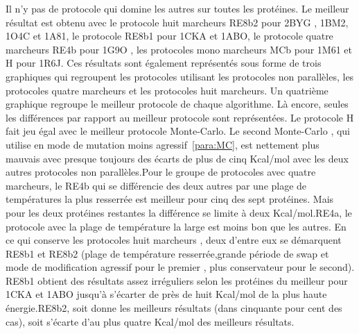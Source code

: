 Il n'y pas de protocole qui domine les autres sur toutes les protéines. Le meilleur résultat est obtenu avec le protocole huit marcheurs RE8b2 pour 2BYG , 1BM2, 1O4C et 1A81, le protocole RE8b1 pour 1CKA et 1ABO, le protocole quatre marcheurs RE4b pour 1G9O , les protocoles mono marcheurs MCb pour 1M61 et H pour 1R6J.  Ces résultats sont également représentés sous forme de trois graphiques qui regroupent les protocoles utilisant les protocoles non parallèles, les protocoles quatre marcheurs et les protocoles huit marcheurs. Un quatrième graphique regroupe le meilleur protocole de chaque algorithme. Là encore, seules les différences par rapport au meilleur protocole sont représentées. Le protocole H fait jeu égal avec le meilleur protocole Monte-Carlo. Le second Monte-Carlo , qui utilise en mode de mutation moins agressif~\ref{para:MC}, est nettement plus mauvais avec presque toujours des écarts de plus de cinq Kcal/mol avec les deux autres protocoles non parallèles.Pour le groupe de protocoles avec quatre marcheurs, le RE4b qui se différencie des deux autres par une plage de températures la plus resserrée est meilleur pour cinq des sept protéines. Mais pour les deux protéines restantes la différence se limite à deux Kcal/mol.RE4a, le protocole avec la plage de température la large est moins bon que les autres. En ce qui conserve les protocoles huit marcheurs , deux d'entre eux se démarquent RE8b1 et RE8b2 (plage de température resserrée,grande période de swap et mode de modification agressif pour le premier , plus conservateur pour le second). RE8b1 obtient des résultats assez irréguliers selon les protéines du meilleur pour 1CKA et 1ABO jusqu'à s'écarter de près de huit Kcal/mol de la plus haute énergie.RE8b2, soit donne les meilleurs résultats (dans cinquante pour cent des cas), soit s'écarte d'au plus quatre Kcal/mol des meilleurs résultats.  

